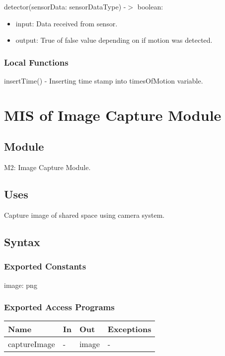 \documentclass[12pt, titlepage]{article}
\begin{document}
\noindent detector(sensorData: sensorDataType) -$>$ boolean:
\begin{itemize}
\item input: Data received from sensor. 
\item output: True of false value depending on if motion was detected. 
\end{itemize}

\subsubsection{Local Functions}

insertTime() - Inserting time stamp into timesOfMotion variable.


\newpage


\section{MIS of Image Capture Module} \label{Module} 

\subsection{Module}

M2: Image Capture Module.

\subsection{Uses}
Capture image of shared space using camera system.

\subsection{Syntax}

\subsubsection{Exported Constants}
image: png

\subsubsection{Exported Access Programs}

\begin{center}
\begin{tabular}{p{4cm} p{4cm} p{4cm} p{2cm}}
\hline
\textbf{Name} & \textbf{In} & \textbf{Out} & \textbf{Exceptions} \\
\hline
captureImage & - & image & - \\
\hline
\end{tabular}
\end{center}
\end{document}
